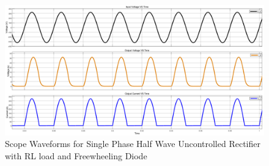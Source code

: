 \begin{figure}[h]
    \centering
    \includegraphics[width=1.0\textwidth]{images/experiment-1/circuit-scope-experiment-03.png}
    \caption{Scope Waveforms for Single Phase Half Wave Uncontrolled Rectifier with RL load and Freewheeling Diode}
    \label{Fig_waveform_single-phase-half-wave-uncontrolled-rectifier-with-RL-load-and-freewheeling-diode}
\end{figure}


\pagebreak


